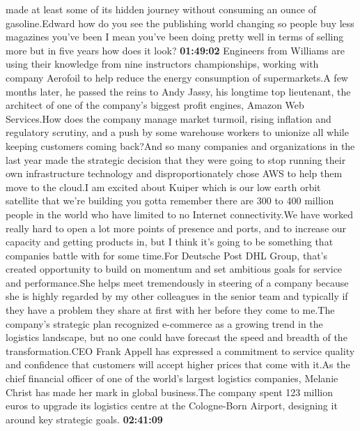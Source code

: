\documentclass{article}%
\begin{document}
made at least some of its hidden journey without consuming an ounce of gasoline.Edward how do you see the publishing world changing so people buy less magazines you've been I mean you've been doing pretty well in terms of selling more but in five years how does it look?%
\textbf{01:49:02}%
\newline%
Engineers from Williams are using their knowledge from nine instructors championships, working with company Aerofoil to help reduce the energy consumption of supermarkets.A few months later, he passed the reins to Andy Jassy, his longtime top lieutenant, the architect of one of the company's biggest profit engines, Amazon Web Services.How does the company manage market turmoil, rising inflation and regulatory scrutiny, and a push by some warehouse workers to unionize all while keeping customers coming back?And so many companies and organizations in the last year made the strategic decision that they were going to stop running their own infrastructure technology and disproportionately chose AWS to help them move to the cloud.I am excited about Kuiper which is our low earth orbit satellite that we're building you gotta remember there are 300 to 400 million people in the world who have limited to no Internet connectivity.We have worked really hard to open a lot more points of presence and ports, and to increase our capacity and getting products in, but I think it's going to be something that companies battle with for some time.For Deutsche Post DHL Group, that's created opportunity to build on momentum and set ambitious goals for service and performance.She helps meet tremendously in steering of a company because she is highly regarded by my other colleagues in the senior team and typically if they have a problem they share at first with her before they come to me.The company's strategic plan recognized e{-}commerce as a growing trend in the logistics landscape, but no one could have forecast the speed and breadth of the transformation.CEO Frank Appell has expressed a commitment to service quality and confidence that customers will accept higher prices that come with it.As the chief financial officer of one of the world's largest logistics companies, Melanie Christ has made her mark in global business.The company spent 123 million euros to upgrade its logistics centre at the Cologne{-}Born Airport, designing it around key strategic goals.%
\textbf{02:41:09}%
\newline%
\end{document}
